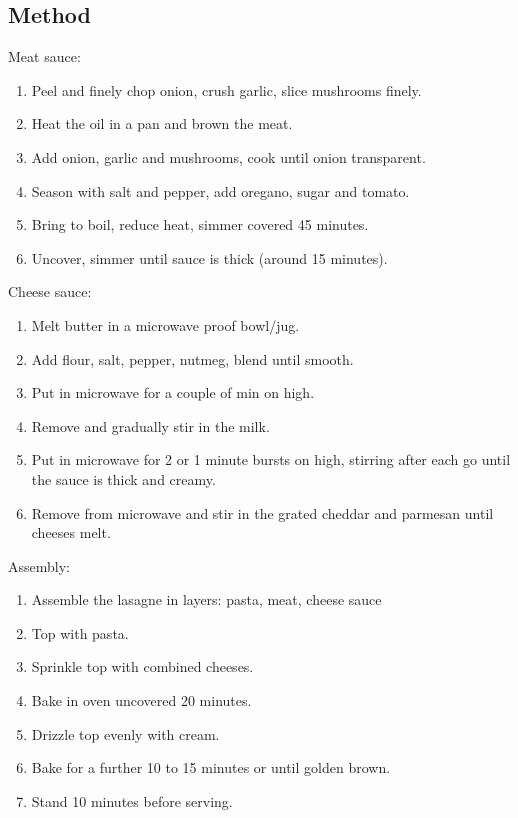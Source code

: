 \subsection{Method}

Meat sauce:

\begin{enumerate}
    \item Peel and finely chop onion, crush garlic, slice mushrooms finely.
    \item Heat the oil in a pan and brown the meat.
    \item Add onion, garlic and mushrooms, cook until onion transparent.
    \item Season with salt and pepper, add oregano, sugar and tomato.
    \item Bring to boil, reduce heat, simmer covered 45 minutes.
    \item Uncover, simmer until sauce is thick (around 15 minutes).
\end{enumerate}

Cheese sauce:

\begin{enumerate}
    \item Melt butter in a microwave proof bowl/jug.
    \item Add flour, salt, pepper, nutmeg, blend until smooth.
    \item Put in microwave for a couple of min on high.
    \item Remove and gradually stir in the milk.
    \item Put in microwave for 2 or 1 minute bursts on high, stirring after each go until the sauce is thick and creamy.
    \item Remove from microwave and stir in the grated cheddar and parmesan until cheeses melt.
\end{enumerate}

Assembly:

\begin{enumerate}
    \item Assemble the lasagne in layers: pasta, meat, cheese sauce
    \item Top with pasta.
    \item Sprinkle top with combined cheeses.
    \item Bake in  oven uncovered 20 minutes.
    \item Drizzle top evenly with cream.
    \item Bake for a further 10 to 15 minutes or until golden brown.
    \item Stand 10 minutes before serving.
\end{enumerate}
